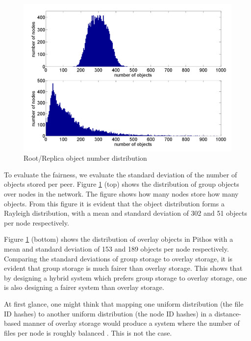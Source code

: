 \documentclass[10pt,a4paper,conference]{IEEEtran}
\begin{document}
\begin{figure}[htbp]
 \centering
 \includegraphics[clip=true, viewport=1cm 0.5cm 28.5cm 20cm, width=\columnwidth]{RootRepOverlayObjects}
 \caption{Root/Replica object number distribution}
 \label{fig_group_overlay_objects}
\end{figure}
%
To evaluate the fairness, we evaluate the standard deviation of the number of objects stored per peer. Figure \ref{fig_group_overlay_objects} (top)
shows the distribution of group objects over nodes in the network. The figure shows how many nodes store how many objects. From this figure it is
evident that the object distribution forms a Rayleigh distribution, with a mean and standard deviation of 302 and 51 objects per node respectively.

Figure \ref{fig_group_overlay_objects} (bottom) shows the distribution of overlay objects in Pithos with a mean and standard deviation of 153 and 189
objects per node respectively. Comparing the standard deviations of group storage to overlay storage, it is evident that group storage is much fairer
than overlay storage. This shows that by designing a hybrid system which prefers group storage to overlay storage, one is also designing a fairer
system than overlay storage.

At first glance, one might think that mapping one uniform distribution (the file ID hashes) to another uniform distribution (the node ID hashes) in a
distance-based manner of overlay storage would produce a system where the number of files per node is roughly balanced
\cite{storage_and_chaching_PAST}. This is not the case.
\end{document}
